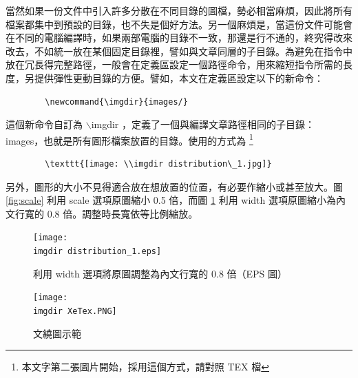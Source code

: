 當然如果一份文件中引入許多分散在不同目錄的圖檔，勢必相當麻煩，因此將所有檔案都集中到預設的目錄，也不失是個好方法。另一個麻煩是，當這份文件可能會在不同的電腦編譯時，如果兩部電腦的目錄不一致，那還是行不通的，終究得改來改去，不如統一放在某個固定目錄裡，譬如與文章同層的子目錄。為避免在指令中放在冗長得完整路徑，一般會在定義區設定一個路徑命令，用來縮短指令所需的長度，另提供彈性更動目錄的方便。譬如，本文在定義區設定以下的新命令：

\bigskip
	\begin{lstlisting}
		\newcommand{\imgdir}{images/}	
	\end{lstlisting}

這個新命令自訂為  $\backslash$imgdir ，定義了一個與編譯文章路徑相同的子目錄：images，也就是所有圖形檔案放置的目錄。使用的方式為 \footnote{本文字第二張圖片開始，採用這個方式，請對照 TEX 檔}

\bigskip
	\begin{lstlisting}
		\texttt{[image: \\imgdir distribution\_1.jpg]}	
	\end{lstlisting}
	
另外，圖形的大小不見得適合放在想放置的位置，有必要作縮小或甚至放大。圖 \ref{fig:scale}  利用  scale 選項原圖縮小 0.5 倍，而圖 \ref{fig:width} 利用 width 選項原圖縮小為內文行寬的 0.8 倍。調整時長寬依等比例縮放。\\

\begin{figure}[H]
    \centering
    \texttt{[image: \\imgdir distribution\_1.eps]}
    \caption{利用 width 選項將原圖調整為內文行寬的 0.8 倍（EPS 圖）}
    \label{fig:width}
\end{figure}

\begin{figure}
\centering
\texttt{[image: \\imgdir XeTex.PNG]}
\caption{文繞圖示範}\label{fig:PNG}
\end{figure}

